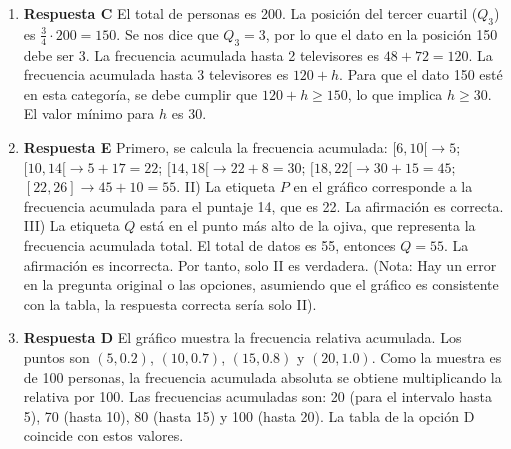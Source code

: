 \documentclass[11pt]{article}
\begin{document}
\begin{enumerate}
    \item \textbf{Respuesta C} El total de personas es 200. La posición del tercer cuartil ($Q_3$) es $\frac{3}{4} \cdot 200 = 150$. Se nos dice que $Q_3=3$, por lo que el dato en la posición 150 debe ser 3. La frecuencia acumulada hasta 2 televisores es $48+72=120$. La frecuencia acumulada hasta 3 televisores es $120+h$. Para que el dato 150 esté en esta categoría, se debe cumplir que $120 + h \geq 150$, lo que implica $h \geq 30$. El valor mínimo para $h$ es 30. %

    \item \textbf{Respuesta E} Primero, se calcula la frecuencia acumulada: $[6,10[ \rightarrow 5$; $[10,14[ \rightarrow 5+17=22$; $[14,18[ \rightarrow 22+8=30$; $[18,22[ \rightarrow 30+15=45$; $[22,26] \rightarrow 45+10=55$. II) La etiqueta $P$ en el gráfico corresponde a la frecuencia acumulada para el puntaje 14, que es 22. La afirmación es correcta. III) La etiqueta $Q$ está en el punto más alto de la ojiva, que representa la frecuencia acumulada total. El total de datos es 55, entonces $Q=55$. La afirmación es incorrecta. Por tanto, solo II es verdadera. (Nota: Hay un error en la pregunta original o las opciones, asumiendo que el gráfico es consistente con la tabla, la respuesta correcta sería solo II). %
    
    \item \textbf{Respuesta D} El gráfico muestra la frecuencia relativa acumulada. Los puntos son $(5, 0.2)$, $(10, 0.7)$, $(15, 0.8)$ y $(20, 1.0)$. Como la muestra es de 100 personas, la frecuencia acumulada absoluta se obtiene multiplicando la relativa por 100. Las frecuencias acumuladas son: 20 (para el intervalo hasta 5), 70 (hasta 10), 80 (hasta 15) y 100 (hasta 20). La tabla de la opción D coincide con estos valores. %


\end{enumerate}
\end{document}
